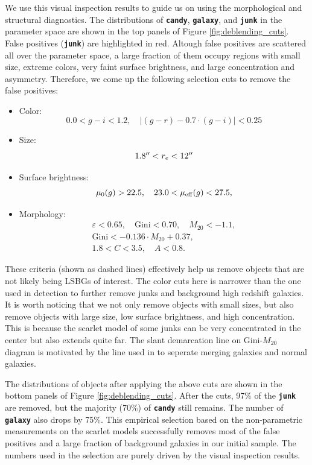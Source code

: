 \documentclass[twocolumn,astrosymb,twocolappendix]{aastex631}
\newcommand{\code}[1]{\textbf{\texttt{#1}}}
\begin{document}
\begin{CJK*}{UTF8}{gbsn}
We use this visual inspection results to guide us on using the morphological and structural diagnostics. The distributions of \code{candy}, \code{galaxy}, and \code{junk} in the parameter space are shown in the top panels of Figure \ref{fig:deblending_cuts}. False positives (\code{junk}) are highlighted in red. Altough false positives are scattered all over the parameter space, a large fraction of them occupy regions with small size, extreme colors, very faint surface brightness, and large concentration and asymmetry. Therefore, we come up the following selection cuts to remove the false positives:
\begin{itemize}
    \item Color:
    \[0.0 < g-i < 1.2,\quad |(g-r) - 0.7\cdot (g-i)| < 0.25\]
    \item Size: \[1.8 \mbox{$^{\prime\prime}$} < r_e < 12 \mbox{$^{\prime\prime}$}\]
    \item Surface brightness: \[\mu_0(g) > 22.5,\quad 23.0 < \mu_{\rm eff}(g) < 27.5,\]
    \item Morphology: 
    \begin{gather*}
        \varepsilon < 0.65,\quad \mathrm{Gini} < 0.70,\quad M_{20} < -1.1,\\
        \mathrm{Gini} < -0.136\cdot M_{20} + 0.37,\\
        1.8 < C < 3.5,\quad A < 0.8.
    \end{gather*}
\end{itemize}
These criteria (shown as dashed lines) effectively help us remove objects that are not likely being LSBGs of interest. The color cuts here is narrower than the one used in detection to further remove junks and background high redshift galaxies. It is worth noticing that we not only remove objects with small sizes, but also remove objects with large size, low surface brightness, and high concentration. This is because the scarlet model of some junks can be very concentrated in the center but also extends quite far. The slant demarcation line on Gini-$M_{20}$ diagram is motivated by the line used in \citet{Lotz2008} to seperate merging galaxies and normal galaxies. 

The distributions of objects after applying the above cuts are shown in the bottom panels of Figure \ref{fig:deblending_cuts}. After the cuts, 97\% of the \code{junk} are removed, but the majority (70\%) of \code{candy} still remains. The number of \code{galaxy} also drops by 75\%. This empirical selection based on the non-parametric measurements on the scarlet models successfully removes most of the false positives and a large fraction of background galaxies in our initial sample. The numbers used in the selection are purely driven by the visual inspection results. 


\end{CJK*}
\end{document}
